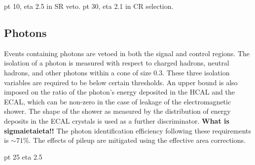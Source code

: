 

pt 10, eta 2.5 in SR veto. pt 30, eta 2.1 in CR selection.

\subsection*{Photons}



Events containing photons are vetoed in both the signal and control regions. 
The isolation of a photon is measured with respect to charged 
hadrons, neutral hadrons, and other photons within a \detadphi cone of size 
$0.3$. These three isolation variables are required to be below certain 
thresholds. 
An upper bound is also imposed on the ratio of the photon's energy deposited in 
the HCAL and the ECAL, which can be non-zero in the case of leakage of the 
electromagnetic shower. The shape of the shower as measured by the distribution 
of energy deposits in the ECAL crystals is used as a further discriminator. 
\textbf{What is sigmaietaieta!!}
The photon identification efficiency following these requirements is 
$\sim71$\%. The effects of pileup are mitigated using the effective area 
corrections.


pt 25 eta 2.5

